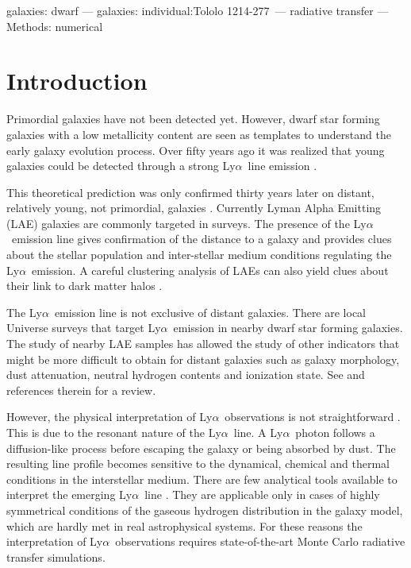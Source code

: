 \documentclass[a4,useAMS,usenatbib,usegraphicx]{mn2e}
\newcommand{\tol}{Tololo 1214-277}
\newcommand{\lya}{\ifmmode{{\rm Ly}\alpha}\else Ly$\alpha$\ \fi}
\begin{document}
\begin{keywords}
galaxies: dwarf --- galaxies: individual:\tol\ --- radiative transfer --- Methods: numerical 
\end{keywords}



\section{Introduction}
\label{sec:introduction}

Primordial galaxies have not been detected yet. 
However, dwarf star forming galaxies with a low metallicity content
are seen as templates to understand the early galaxy evolution process. 
Over fifty years ago it was realized that young galaxies could be
detected through a strong \lya line emission \citep{PartridgePeebles}.    

This theoretical prediction was only confirmed thirty years later on
distant, relatively young, not primordial, galaxies \citep{1998ApJ...498L..93D}.
Currently Lyman Alpha Emitting (LAE) galaxies are commonly targeted
in surveys. 
The presence of the \lya emission line gives confirmation of
the distance to a galaxy and provides clues about the stellar
population and inter-stellar medium conditions regulating the
\lya emission.
A careful clustering analysis of LAEs can also yield clues about their link
to dark matter halos
\citep{2004AJ....128.2073H,2007ApJ...671..278G,2007ApJ...668...15K,2008MNRAS.391.1589O,2010MNRAS.409..184P,2013MNRAS.431.1777G,2016ApJ...828....5M}. 

The \lya emission line is not exclusive of distant galaxies. 
There are local Universe surveys that target \lya emission in nearby
dwarf star forming galaxies.
The study of nearby LAE samples has allowed the study of other
indicators that might be more difficult to obtain for distant galaxies
such as galaxy morphology, dust attenuation, neutral hydrogen contents and
ionization state. See \cite{Hayes15} and references therein for a review.

However, the physical interpretation of \lya observations is
not straightforward \citep{LARS,2015ApJ...805...14R}. 
This is due to the resonant nature of the \lya line. 
A \lya photon follows a diffusion-like process before escaping
the galaxy or being absorbed by dust. 
The resulting line profile becomes sensitive to the dynamical, chemical
and thermal conditions in the interstellar medium. 
There are few analytical tools available to interpret the
emerging \lya line
\citep{Harrington73,1991ApJ...370L..85N,LoebRybicki,2006ApJ...645..792T}. 
They are applicable only in cases of highly symmetrical
conditions of the gaseous hydrogen distribution in the galaxy model,
which are hardly met in real astrophysical systems. 
For these reasons the interpretation of \lya observations
requires state-of-the-art Monte Carlo radiative transfer simulations.   
\end{document}
